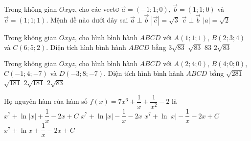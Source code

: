 \begin{ex}%
Trong không gian $Oxyz$, cho các vectơ $\vec{a}=\left(-1;1;0\right)$, $\vec{b}=\left(1;1;0\right)$ và $\vec{c}=\left(1;1;1\right)$. Mệnh đề nào dưới đây sai
\choice
{$\vec{a} \perp \vec{b}$}
{$\left|\vec{c}\right|=\sqrt{3}$}
{\True $\vec{c}\perp \vec{b}$}
{$\left|a\right|=\sqrt{2}$}
\end{ex}

\begin{ex}%
Trong không gian $Oxyz$, cho hình bình hành  $ABCD$ với  $A(1;1;1)$, $B(2;3;4)$ và $C(6;5;2)$. Diện tích hình bình hành $ABCD$  bằng \choice
{$3\sqrt{83} $}
{$\sqrt{83} $}
{$ 83 $}
{\True $2\sqrt{83}$}
\end{ex}

\begin{ex}%
Trong không gian $Oxyz$, cho hình bình hành  $ABCD$ với  $A(2;4;0)$, $B(4;0;0)$,  $C(-1;4;-7)$ và $D(-3;8;-7)$. Diện tích hình bình hành $ABCD$  bằng \choice
{$\sqrt{281} $}
{$\sqrt{181} $}
{\True $ 2\sqrt{181} $}
{$2\sqrt{83}$}

\end{ex}

\begin{ex}%
Họ nguyên hàm của hàm số $f(x)=7 x^{6}+\dfrac{1}{x}+\dfrac{1}{x^2}-2$ là
\choice
{$x^{7}+\ln |x|+\dfrac{1}{x}-2x+C$}
{$x^{7}+\ln |x|-\dfrac{1}{x}-2x$}
{\True $x^{7}+\ln |x|-\dfrac{1}{x}-2x+C$}
{$x^{7}+\ln x+\dfrac{1}{x}-2x+C$}
\end{ex}

